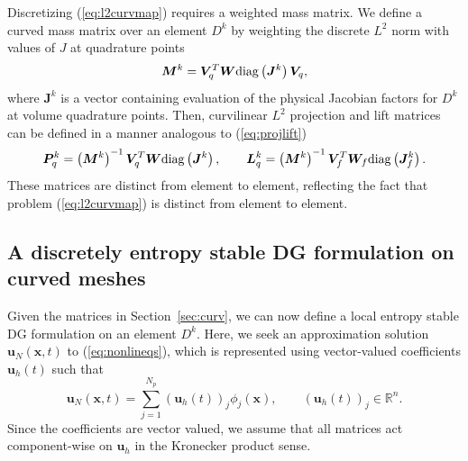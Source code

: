 \documentclass[10pt]{amsart}
\theoremstyle{definition}
\theoremstyle{lemma}
\theoremstyle{theorem}
\theoremstyle{assumption}
\newcommand{\LRp}[1]{\left( #1 \right)}
\newcommand{\diag}[1]{{\rm diag}\LRp{#1}}
\begin{document}
{Discretizing (\ref{eq:l2curvmap}) requires a weighted mass matrix.  We define a curved mass matrix over an element $D^k$ by weighting the discrete $L^2$ norm with values of $J$ at quadrature points
\begin{equation}
\bm{M}^k = \bm{V}_q^T \bm{W}\diag{\bm{J}^k}\bm{V}_q,
\label{eq:curvedmass}
\end{equation}
where $\bm{J}^k$ is a vector containing evaluation of the physical Jacobian factors for $D^k$ at volume quadrature points.
Then, curvilinear $L^2$ projection and lift matrices can be defined in a manner analogous to (\ref{eq:projlift})
\begin{equation}
\bm{P}^k_q = \LRp{\bm{M}^k}^{-1}\bm{V}_q^T\bm{W}\diag{\bm{J}^k}, \qquad \bm{L}^k_q = \LRp{\bm{M}^k}^{-1}\bm{V}_f^T\bm{W}_f\diag{\bm{J}^k_f}.
\label{eq:projliftcurved}
\end{equation}
These matrices are distinct from element to element, reflecting the fact that problem (\ref{eq:l2curvmap}) is distinct from element to element.  

\subsection{A discretely entropy stable DG formulation on curved meshes}

Given the matrices in Section~\ref{sec:curv}, we can now define a local entropy stable DG formulation on an element $D^k$.  Here, we seek an approximation solution $\bm{u}_N(\bm{x},t)$ to (\ref{eq:nonlineqs}), which is represented using vector-valued coefficients $\bm{u}_h(t)$ such that
\[
\bm{u}_N(\bm{x},t) = \sum_{j=1}^{N_p} \LRp{\bm{u}_h(t)}_j \phi_j(\bm{x}), \qquad \LRp{\bm{u}_h(t)}_j \in \mathbb{R}^n.
\]
Since the coefficients are vector valued, we assume that all matrices act component-wise on $\bm{u}_h$ in the Kronecker product sense.  

}
\end{document}
